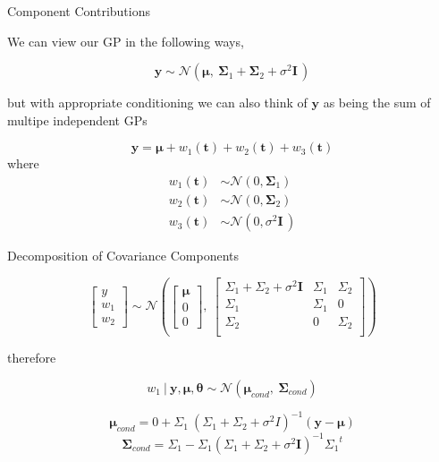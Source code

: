 \documentclass[11pt,ignorenonframetext,]{beamer}
\begin{document}
\begin{frame}[t]{%
\protect\hypertarget{component-contributions}{%
Component Contributions}}

We can view our GP in the following ways,

\[ \symbf{y} \sim \mathcal{N}(\symbf{\mu},~ \symbf{\Sigma}_1 + \symbf{\Sigma}_2 + \sigma^2 \symbf{I}\,) \]

but with appropriate conditioning we can also think of \(\symbf{y}\) as
being the sum of multipe independent GPs

\[ \symbf{y} = \symbf{\mu} + w_1(\symbf{t}) + w_2(\symbf{t}) + w_3(\symbf{t})\]
where \[
\begin{aligned}
w_1(\symbf{t}) &\sim \mathcal{N}(0, \symbf{\Sigma}_1) \\
w_2(\symbf{t}) &\sim \mathcal{N}(0, \symbf{\Sigma}_2) \\
w_3(\symbf{t}) &\sim \mathcal{N}(0, \sigma^2 \symbf{I}\,)
\end{aligned}
\]

\end{frame}

\begin{frame}[t]{%
\protect\hypertarget{decomposition-of-covariance-components}{%
Decomposition of Covariance Components}}

\footnotesize

\[ \begin{bmatrix} 
y \\
w_1 \\
w_2
\end{bmatrix} 
\sim \mathcal{N} \left(
\begin{bmatrix}
\symbf{\mu} \\ 0 \\ 0
\end{bmatrix},~
\begin{bmatrix}
\Sigma_1 + \Sigma_2 + \sigma^2 \symbf{I} & \Sigma_1 & \Sigma_2 \\
\Sigma_1 & \Sigma_1 & 0\\
\Sigma_2 & 0  & \Sigma_2 \\
\end{bmatrix}
\right)
\]

\normalsize

therefore

\[ w_1 ~|~ \symbf{y},\symbf{\mu},\symbf{\theta} \sim \mathcal{N}(\symbf{\mu}_{cond},~ \symbf{\Sigma}_{cond}) \]

\[ \symbf{\mu}_{cond} = 0 + \Sigma_1 ~ (\Sigma_1 + \Sigma_2 + \sigma^2 I)^{-1}(\symbf{y}-\symbf{\mu}) \]
\[ \symbf{\Sigma}_{cond} = \Sigma_1 - \Sigma_1 (\Sigma_1 + \Sigma_2 + \sigma^2 \symbf{I})^{-1} {\Sigma_1}^t \]

\end{frame}
\end{document}
